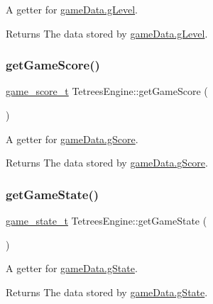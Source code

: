 A getter for \mbox{\hyperlink{TetreesDefs_8hpp_aebae08b2e3a36f1452b33acaf1eaab40}{game\+Data.g\+Level}}. \begin{DoxyReturn}{Returns}
The data stored by \mbox{\hyperlink{TetreesDefs_8hpp_aebae08b2e3a36f1452b33acaf1eaab40}{game\+Data.g\+Level}}. 
\end{DoxyReturn}
\mbox{\label{classTetreesEngine_a46108b9a7ea4ab8ebd27323f9752e208}} 
\subsubsection{\texorpdfstring{get\+Game\+Score()}{getGameScore()}}
{\footnotesize\ttfamily \mbox{\hyperlink{structgame__score__t}{game\+\_\+score\+\_\+t}} Tetrees\+Engine\+::get\+Game\+Score (\begin{DoxyParamCaption}{ }\end{DoxyParamCaption})}

A getter for \mbox{\hyperlink{TetreesDefs_8hpp_aebae08b2e3a36f1452b33acaf1eaab40}{game\+Data.g\+Score}}. \begin{DoxyReturn}{Returns}
The data stored by \mbox{\hyperlink{TetreesDefs_8hpp_aebae08b2e3a36f1452b33acaf1eaab40}{game\+Data.g\+Score}}. 
\end{DoxyReturn}
\mbox{\label{classTetreesEngine_a36e231a33457f87875f19d308984b0b8}} 
\subsubsection{\texorpdfstring{get\+Game\+State()}{getGameState()}}
{\footnotesize\ttfamily \mbox{\hyperlink{TetreesDefs_8hpp_aebae08b2e3a36f1452b33acaf1eaab40}{game\+\_\+state\+\_\+t}} Tetrees\+Engine\+::get\+Game\+State (\begin{DoxyParamCaption}{ }\end{DoxyParamCaption})}

A getter for \mbox{\hyperlink{TetreesDefs_8hpp_aebae08b2e3a36f1452b33acaf1eaab40}{game\+Data.g\+State}}. \begin{DoxyReturn}{Returns}
The data stored by \mbox{\hyperlink{TetreesDefs_8hpp_aebae08b2e3a36f1452b33acaf1eaab40}{game\+Data.g\+State}}. 
\end{DoxyReturn}
\mbox{\label{classTetreesEngine_a78698174a309f2a4d74da9fd47167f56}} 
